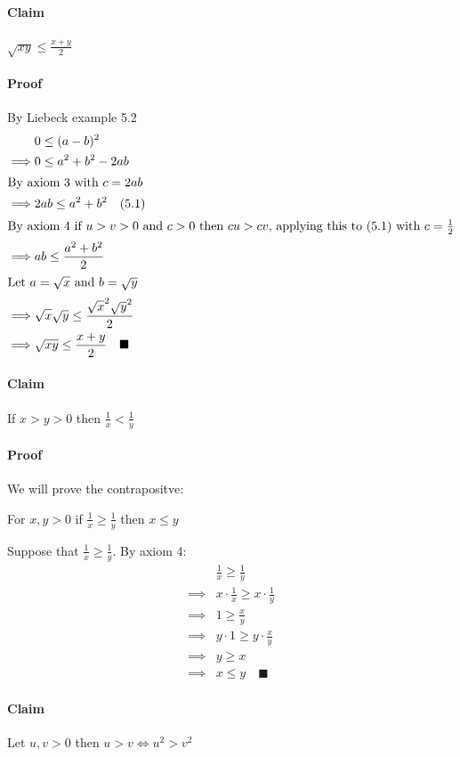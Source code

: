 \documentclass{article}
\newcounter{example}[section]
\begin{document}
\paragraph{Claim} \(\sqrt{xy}\le\frac{x+y}{2}\)
\paragraph{Proof} By Liebeck example 5.2
\begin{align*}
&0\le(a-b)^2\\
\implies&0\le a^2+b^2-2ab\\
\intertext{By axiom 3 with \(c=2ab\)}
\implies&2ab\le a^2+b^2\quad(5.1)\\
\intertext{By axiom 4 if \(u>v>0\) and \(c>0\) then \(cu>cv\), applying this to (5.1) with \(c=\frac 12\)}
\implies&ab\le\frac{a^2+b^2}{2}\\
\intertext{Let \(a=\sqrt x\) and \(b=\sqrt y\)}
\implies&\sqrt x \sqrt y\le\frac{\sqrt x^2\sqrt y^2}{2}\\
\implies&\sqrt{xy}\le\frac{x+y}{2}\quad\blacksquare
\end{align*}

\paragraph{Claim} If \(x>y>0\) then \(\frac 1x<\frac 1y\)

\paragraph{Proof} We will prove the contrapositve:

For \(x,y>0\) if \(\frac 1x\ge\frac 1y\) then \(x\le y\)

Suppose that \(\frac 1x\ge\frac 1y\). By axiom 4:
\begin{align*}
&\frac 1x\ge\frac 1y\\
\implies&x\cdot\frac 1x\ge x\cdot\frac 1y\\
\implies&1\ge\frac xy\\
\implies&y\cdot1\ge y\cdot\frac xy\\
\implies &y\ge x\\
\implies&x\le y\quad \blacksquare
\end{align*}

\paragraph{Claim} Let \(u,v>0\) then \(u>v\iff u^2>v^2\)
\end{document}
